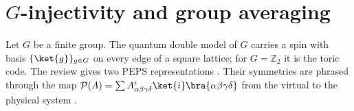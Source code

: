 \section{\texorpdfstring{$G$}{G}-injectivity and group averaging}%
\label{sec:peps_quantum_double}

Let $G$ be a finite group. The quantum double model of $G$
\cite{Kitaev2003FaultTolerant} carries a spin with basis
$\{\ket{g}\}_{g\in G}$ on every edge of a square lattice; for
$G=\mathbb{Z}_2$ it is the toric code. The review gives two PEPS
representations \cite[Appendix~A, ``The Toric Code and quantum double
    models'']{Cirac2021Matrix}. Their symmetries are phrased through the map
$\mathcal{P}(A)=\sum A^i_{\alpha\beta\gamma\delta}\ket{i}\bra{\alpha\beta\gamma\delta}$
from the virtual to the physical system
\cite[Section~``MPS and PEPS'']{Schuch2010PEPS}.

